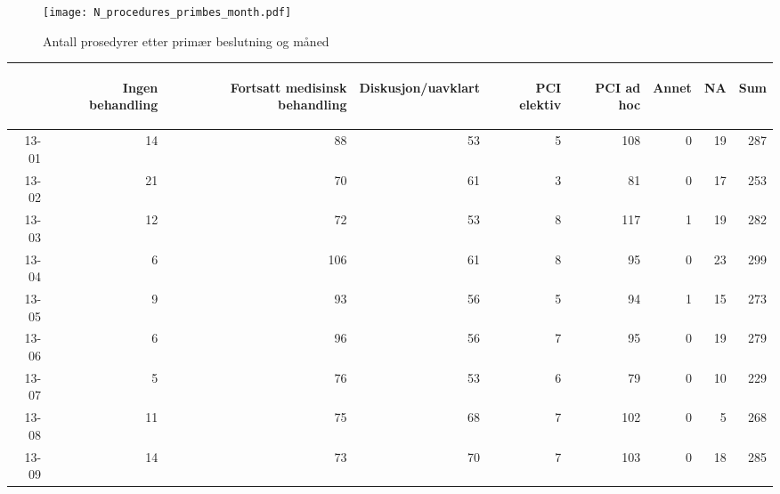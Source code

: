 \documentclass[presentation,xcolor=pdftex,dvipsnames,table]{beamer}
\begin{document}

\begin{frame}
\begin{figure}
  \centering
  \caption{Antall prosedyrer etter primær beslutning og måned}
\texttt{[image: N\_procedures\_primbes\_month.pdf]}
\end{figure}\end{frame}


\begin{frame}
\begin{tiny}
\begin{table}[ht]
\centering
\begin{tabular}{rrrrrrrrr}
  \toprule
 & \begin{sideways} Ingen behandling \end{sideways} & \begin{sideways} Fortsatt medisinsk behandling \end{sideways} & \begin{sideways} Diskusjon/uavklart \end{sideways} & \begin{sideways} PCI elektiv \end{sideways} & \begin{sideways} PCI ad hoc \end{sideways} & \begin{sideways} Annet \end{sideways} & \begin{sideways} NA \end{sideways} & \begin{sideways} Sum \end{sideways} \\ 
  \midrule
13-01 & 14 & 88 & 53 & 5 & 108 & 0 & 19 & 287 \\ 
  13-02 & 21 & 70 & 61 & 3 & 81 & 0 & 17 & 253 \\ 
  13-03 & 12 & 72 & 53 & 8 & 117 & 1 & 19 & 282 \\ 
  13-04 & 6 & 106 & 61 & 8 & 95 & 0 & 23 & 299 \\ 
  13-05 & 9 & 93 & 56 & 5 & 94 & 1 & 15 & 273 \\ 
  13-06 & 6 & 96 & 56 & 7 & 95 & 0 & 19 & 279 \\ 
  13-07 & 5 & 76 & 53 & 6 & 79 & 0 & 10 & 229 \\ 
  13-08 & 11 & 75 & 68 & 7 & 102 & 0 & 5 & 268 \\ 
  13-09 & 14 & 73 & 70 & 7 & 103 & 0 & 18 & 285 \\ 

\end{tabular}
\end{table}
\end{tiny}
\end{frame}
\end{document}
